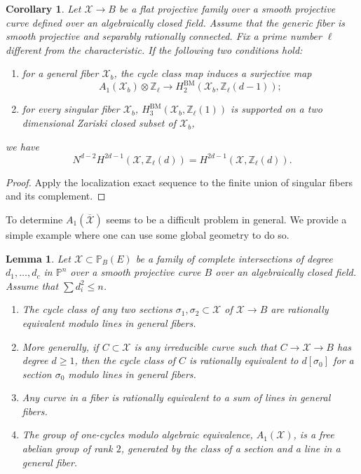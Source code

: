 \documentclass{amsart}
\newtheorem{cor}[theorem]{Corollary}
\newtheorem{lem}[theorem]{Lemma}
\theoremstyle{definition}
\theoremstyle{remark}
\newcommand{\mbb}{\mathbb}
\newcommand{\ZZ}{\mbb{Z}}
\newcommand{\PP}{\mbb{P}}
\newcommand{\mc}{\mathcal}
\newcommand{\mcX}{\mc{X}}
\begin{document}
\begin{cor}\label{cor:sm_fil}
    Let $\mcX \to B$ be a flat projective family over a smooth projective curve defined over an algebraically closed field.
    Assume that the generic fiber is smooth projective and separably rationally connected. 
    Fix a prime number $\ell$ different from the characteristic.
    If the following two conditions hold:
    \begin{enumerate}
        \item for a general fiber $\mcX_b$, the cycle class map induces a surjective map $$A_1(\mcX_b)\otimes \ZZ_\ell \to H^{\text{BM}}_2(\mcX_b, \ZZ_\ell(d-1));$$
        \item for every singular fiber $\mcX_b$, $H_3^{\text{BM}}(\mcX_b, \ZZ_\ell(1))$ is supported on a two dimensional Zariski closed subset of $\mcX_b$,
    \end{enumerate}
    we have
    \[
    N^{d-2}H^{2d-1}(\mcX, \ZZ_\ell(d))=H^{2d-1}(\mcX, \ZZ_\ell(d)).
    \]
\end{cor}
\begin{proof}
 Apply the localization exact sequence to the finite union of singular fibers and its complement.
\end{proof}
To determine $A_1(\overline{\mcX})$ seems to be a difficult problem in general.
We provide a simple example where one can use some global geometry to do so.
\begin{lem}\label{lem:multisection}
    Let $\mcX \subset \PP_B(E)$ be a family of complete intersections of degree $d_1, \ldots, d_c$ in $\PP^n$ over a smooth projective curve $B$ over an algebraically closed field.
    Assume that $\sum d_i^2\leq n$.
    \begin{enumerate}
        \item The cycle class of any two sections $\sigma_1, \sigma_2 \subset \mcX$ of $\mcX \to B$ are rationally equivalent modulo lines in general fibers.
        \item More generally, if $C\subset \mcX$ is any irreducible curve such that $C \to \mcX \to B$ has degree $d\geq 1$, then the cycle class of $C$ is rationally equivalent to $d[\sigma_0]$ for a section $\sigma_0$ modulo lines in general fibers.
        \item Any curve in a fiber is rationally equivalent to a sum of lines in general fibers.
        \item The group of one-cycles modulo algebraic equivalence, $A_1(\mcX)$, is a free abelian group of rank $2$, generated by the class of a section and a line in a general fiber.
    \end{enumerate}
    
    
\end{lem}
\end{document}
